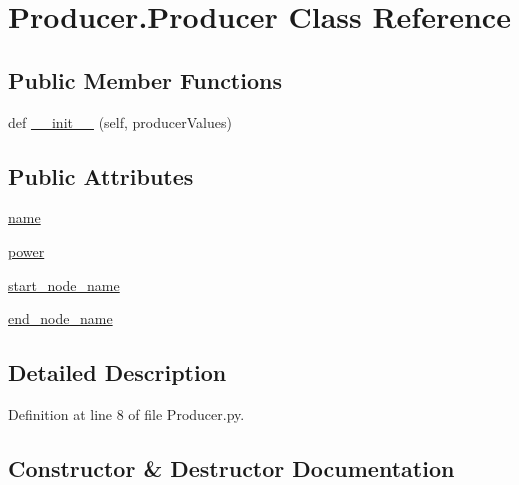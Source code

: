 \hypertarget{class_producer_1_1_producer}{}\section{Producer.\+Producer Class Reference}
\label{class_producer_1_1_producer}
\subsection*{Public Member Functions}
\begin{DoxyCompactItemize}
\item 
def \hyperlink{class_producer_1_1_producer_a539019a9459d608c34054052cc95e968}{\+\_\+\+\_\+init\+\_\+\+\_\+} (self, producer\+Values)
\end{DoxyCompactItemize}
\subsection*{Public Attributes}
\begin{DoxyCompactItemize}
\item 
\hyperlink{class_producer_1_1_producer_ad67f942ec31acad8c3ce847c70303830}{name}
\item 
\hyperlink{class_producer_1_1_producer_aab72b0ca4a83c49bb24847a3c11ff990}{power}
\item 
\hyperlink{class_producer_1_1_producer_ac2dfdc8e4a892cf9ada2722051190045}{start\+\_\+node\+\_\+name}
\item 
\hyperlink{class_producer_1_1_producer_ad58b32a20ff969543efeb26ab92cc0c8}{end\+\_\+node\+\_\+name}
\end{DoxyCompactItemize}


\subsection{Detailed Description}


Definition at line 8 of file Producer.\+py.



\subsection{Constructor \& Destructor Documentation}
\mbox{\label{class_producer_1_1_producer_a539019a9459d608c34054052cc95e968}} 
